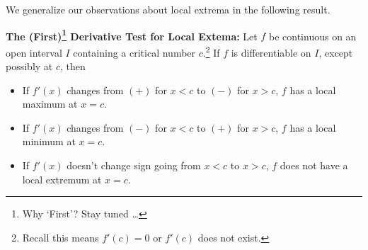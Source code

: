 \documentclass{ximera}
\begin{document}
We generalize our observations about local extrema in the following result.


\begin{theorem}  \label{firstderivatvetest}   \textbf{The (First)\footnote{Why `First'?  Stay tuned \ldots} Derivative Test for Local Extema:}  Let $f$ be continuous on an open interval $I$ containing a critical number $c$.\footnote{Recall this means $f'(c) = 0$ or $f'(c)$ does not exist.}  If $f$ is differentiable on $I$, except possibly at $c$, then  

\begin{itemize}

\item If $f'(x)$ changes from $(+)$ for $x<c$ to $(-)$ for $x>c$, $f$ has a local maximum at $x=c$.

\item If $f'(x)$ changes from $(-)$ for $x<c$ to $(+)$ for $x>c$, $f$ has a local minimum at $x=c$.

\item If $f'(x)$ doesn't change sign going from $x<c$ to $x>c$, $f$ does not have a local extremum at $x=c$.

\end{itemize}

\end{theorem}
\end{document}
